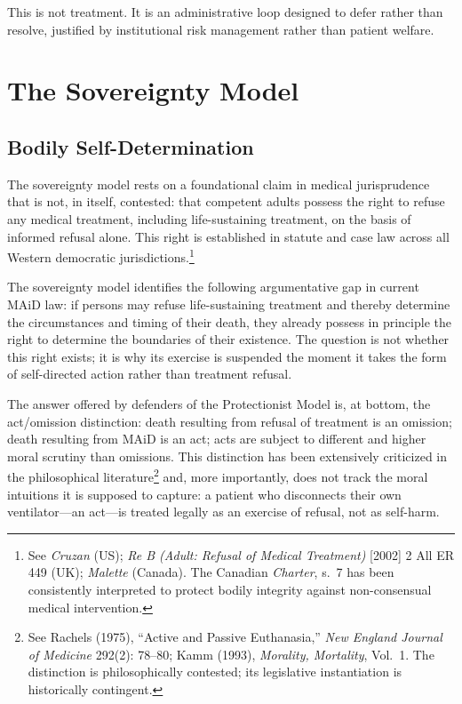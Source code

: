 \documentclass[11pt, letterpaper]{article}
\begin{document}
This is not treatment. It is an administrative loop designed to defer rather than
resolve, justified by institutional risk management rather than patient welfare.

\section{The Sovereignty Model}

\subsection{Bodily Self-Determination}

The sovereignty model rests on a foundational claim in medical jurisprudence that is
not, in itself, contested: that competent adults possess the right to refuse any
medical treatment, including life-sustaining treatment, on the basis of informed
refusal alone. This right is established in statute and case law across all Western
democratic jurisdictions.\footnote{%
  See \textit{Cruzan} (US); \textit{Re B (Adult: Refusal of Medical Treatment)}
  [2002] 2 All ER 449 (UK); \textit{Malette} (Canada). The Canadian \textit{Charter},
  s.\ 7 has been consistently interpreted to protect bodily integrity against
  non-consensual medical intervention.}

The sovereignty model identifies the following argumentative gap in current MAiD law:
if persons may refuse life-sustaining treatment and thereby determine the
circumstances and timing of their death, they already possess in principle the right
to determine the boundaries of their existence. The question is not whether this right
exists; it is why its exercise is suspended the moment it takes the form of
self-directed action rather than treatment refusal.

The answer offered by defenders of the Protectionist Model is, at bottom, the
act/omission distinction: death resulting from refusal of treatment is an omission;
death resulting from MAiD is an act; acts are subject to different and higher moral
scrutiny than omissions. This distinction has been extensively criticized in the
philosophical literature\footnote{%
  See Rachels (1975), ``Active and Passive Euthanasia,''
  \textit{New England Journal of Medicine} 292(2): 78--80; Kamm (1993),
  \textit{Morality, Mortality}, Vol.\ 1. The distinction is philosophically
  contested; its legislative instantiation is historically contingent.}
and, more importantly, does not track the moral intuitions it is supposed to capture:
a patient who disconnects their own ventilator---an act---is treated legally as an
exercise of refusal, not as self-harm.
\end{document}
